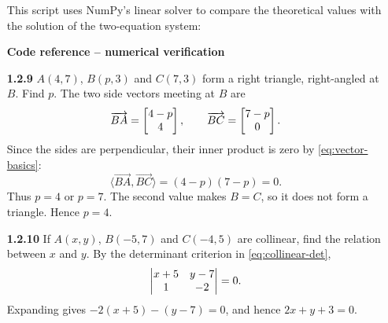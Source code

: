 \begin{enumerate}[label={},leftmargin=0pt,itemsep=9pt]
This script uses NumPy's linear solver to compare the theoretical values with the solution of the two-equation system:
\par\smallskip
\noindent\textbf{Code reference -- numerical verification}
\par\noindent{}
\par\smallskip
\setcounter{qcurrent}{9}\setcounter{equation}{0}
\item[\textbf{1.2.9}] $A(4,7)$, $B(p,3)$ and $C(7,3)$ form a right triangle, right-angled at $B$. Find $p$.
\solution The two side vectors meeting at $B$ are
\begin{equation}
\overrightarrow{BA}=\begin{bmatrix}4-p\\4\end{bmatrix},\qquad \overrightarrow{BC}=\begin{bmatrix}7-p\\0\end{bmatrix}.
\end{equation}
Since the sides are perpendicular, their inner product is zero by \eqref{eq:vector-basics}:
\begin{equation}
\langle\overrightarrow{BA},\overrightarrow{BC}\rangle=(4-p)(7-p)=0.
\end{equation}
Thus $p=4$ or $p=7$. The second value makes $B=C$, so it does not form a triangle. Hence $p=4$.




\setcounter{qcurrent}{10}\setcounter{equation}{0}
\item[\textbf{1.2.10}] If $A(x,y)$, $B(-5,7)$ and $C(-4,5)$ are collinear, find the relation between $x$ and $y$.
\solution By the determinant criterion in \eqref{eq:collinear-det},
\begin{equation}
\begin{vmatrix}x+5&y-7\\1&-2\end{vmatrix}=0.
\end{equation}
Expanding gives $-2(x+5)-(y-7)=0$, and hence $2x+y+3=0$.



\end{enumerate}

